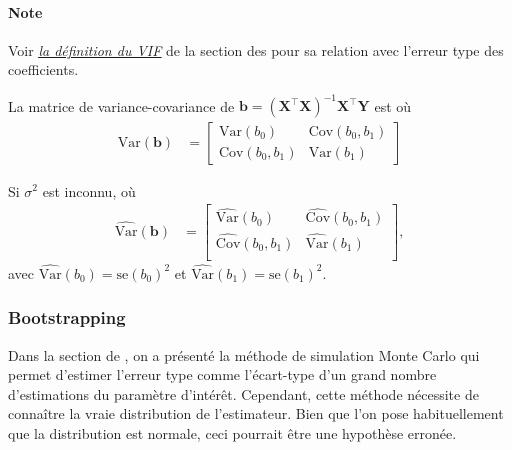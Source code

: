 \documentclass[french]{article}
\begin{document}
\begin{multicols*}{2}
\paragraph{Note}	Voir \textit{\color{bleudefrance}\underline{\hyperlink{VIF}{\color{bleudefrance} la définition du VIF}}} de la section des \textit{\underline{}} pour sa relation avec l'erreur type des coefficients.

\bigskip

\begin{definitionNOHFILL}
La matrice de variance-covariance de $\bm{b} = \left(\bm{X}^{\top} \bm{X}\right)^{-1}\bm{X}^{\top}\bm{Y}$ est  où
\begin{align*}
	\text{Var}(\bm{b})
	&=	\begin{bmatrix}
		\text{Var}(b_{0})		&	\text{Cov}(b_{0}, b_{1})	\\
		\text{Cov}(b_{0}, b_{1})	&	\text{Var}(b_{1})		
		\end{bmatrix}
\end{align*}

\bigskip

Si $\sigma^{2}$ est inconnu,  où 
\begin{align*}
	\widehat{\text{Var}}(\bm{b})
	&=	\begin{bmatrix}
		\widehat{\text{Var}}(b_{0})		&	\widehat{\text{Cov}}(b_{0}, b_{1})	\\
		\widehat{\text{Cov}}(b_{0}, b_{1})	&	\widehat{\text{Var}}(b_{1})		\\
		\end{bmatrix},
\end{align*}
avec $\widehat{\text{Var}}(b_{0}) = \text{se}(b_{0})^{2}$ et $\widehat{\text{Var}}(b_{1}) =\text{se}(b_{1})^{2}$.
\end{definitionNOHFILL}



\columnbreak
\subsubsection{Bootstrapping}
\begin{rappel_enhanced}[Contexte]
Dans la section de \textit{\underline{}}, on a présenté la méthode de simulation Monte Carlo qui permet d'estimer l'erreur type comme l'écart-type d'un grand nombre d'estimations du paramètre d'intérêt. Cependant, cette méthode nécessite de connaître la vraie distribution de l'estimateur. Bien que l'on pose habituellement que la distribution est normale, ceci pourrait être une hypothèse erronée.
\end{rappel_enhanced}


\end{multicols*}
\end{document}
